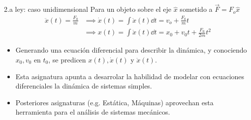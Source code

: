 \documentclass[serif]{beamer}
\begin{document}
\begin{frame}
\begin{block}{2.a ley: caso unidimensional}
Para un objeto sobre el eje \(\hat{x}\) sometido a \(\vec{F}= F_o \hat{x}\)
\begin{align*}
\ddot{x}(t)= \frac{F_0}{m}
& \implies \dot{x}(t)= \int \ddot{x}(t) \dd{t} = v_o + \frac{F_0}{m} t \\
& \implies x(t)= \int \dot{x}(t) \dd{t} = x_0 + v_0 t + \frac{F_0}{2 m} t^2
\end{align*}
\pause
\begin{itemize}				
\item<2-> Generando una ecuación diferencial para describir la dinámica, y conociendo \(x_0, v_0\) en \(t_0\), se predicen \(x(t), \dot{x}(t)\) y \(\ddot{x}(t)\).
\item<3-> Esta asignatura apunta a desarrolar la habilidad de modelar con ecuaciones diferenciales la dinámica de sistemas simples.
\item<4-> Posteriores asignaturas (e.g. Estática, Máquinas) aprovechan esta herramienta para el análisis de sistemas mecánicos.
\end{itemize}				
\end{block}
\end{frame}


\end{document}
